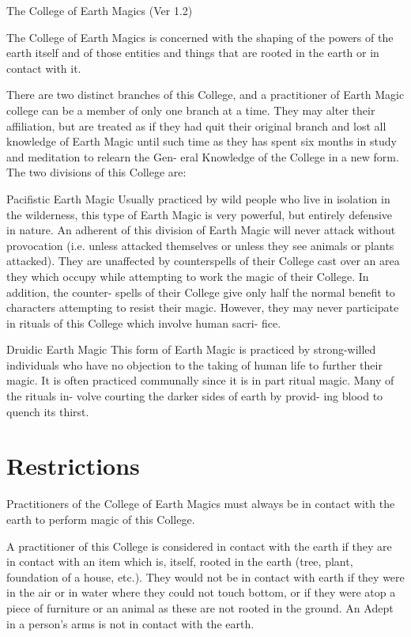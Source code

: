 \begin{Chapter}{The College of Earth Magics (Ver 1.2)}

The College of Earth Magics is concerned with the shaping of the
powers of the earth itself and of those entities and things that are
rooted in the earth or in contact with it.

There are two distinct branches of this College, and 
a  practitioner  of  Earth  Magic  college  can  be  a 
member  of  only  one  branch  at  a  time.  They  may 
alter  their affiliation, but  are  treated as  if  they  had 
quit their original branch and lost all knowledge of 
Earth  Magic  until  such  time  as  they  has  spent  six 
months in study and meditation to relearn the Gen-
eral Knowledge of the College in a new form. The 
two divisions of this College are: 

Pacifistic  Earth  Magic  Usually  practiced  by  wild 
people who live in isolation in the wilderness,  this 
type  of  Earth  Magic  is  very  powerful,  but  entirely 
defensive in nature. An adherent of this division of 
Earth Magic will never attack without provocation 
(i.e.  unless  attacked  themselves  or  unless  they  see 
animals or plants attacked). They are unaffected by 
counterspells  of  their  College  cast  over  an  area 
they  which  occupy  while  attempting  to  work  the 
magic  of  their  College.  In  addition,  the  counter-
spells  of  their  College  give  only  half  the  normal 
benefit  to  characters  attempting  to  resist  their 
magic.  However,  they  may  never  participate  in 
rituals  of  this College  which involve  human  sacri-
fice. 

Druidic  Earth  Magic  This  form  of  Earth  Magic  is 
practiced by strong-willed individuals who have no 
objection  to  the  taking  of  human  life  to  further 
their magic. It is often practiced communally since 
it  is  in  part  ritual  magic.  Many  of  the  rituals  in-
volve courting the darker sides of earth by provid-
ing blood to quench its thirst. 

\section{Restrictions}

Practitioners  of  the  College  of  Earth  Magics  must 
always  be  in  contact  with  the  earth  to  perform 
magic of this College. 

A  practitioner  of  this  College  is  considered  in 
contact with the earth if they are in contact with an 
item which is, itself, rooted in the earth (tree, plant, 
foundation of a house, etc.). They  would not be in 
contact with earth if they were in the air or in water 
where they could not touch bottom, or if they were 
atop a  piece  of  furniture  or  an  animal  as  these  are 
not  rooted  in  the  ground.  An  Adept  in  a  person’s 
arms is not in contact with the earth. 


\end{Chapter}
